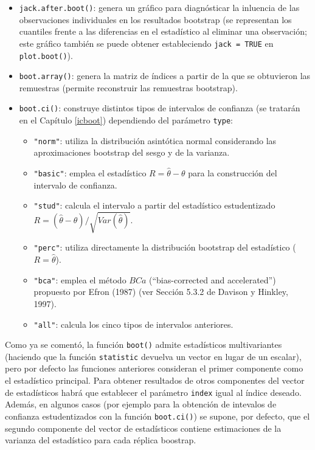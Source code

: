 \documentclass[]{book}
\theoremstyle{break}
\theoremstyle{definition}
\theoremstyle{definition}
\theoremstyle{definition}
\theoremstyle{remark}
\begin{document}
\begin{itemize}
\item
  \texttt{jack.after.boot()}: genera un gráfico para diagnósticar la
  inluencia de las observaciones individuales en los resultados
  bootstrap (se representan los cuantiles frente a las diferencias en el
  estadístico al eliminar una observación; este gráfico también se puede
  obtener estableciendo \texttt{jack\ =\ TRUE} en \texttt{plot.boot()}).
\item
  \texttt{boot.array()}: genera la matriz de índices a partir de la que
  se obtuvieron las remuestras (permite reconstruir las remuestras
  bootstrap).
\item
  \texttt{boot.ci()}: construye distintos tipos de intervalos de
  confianza (se tratarán en el Capítulo \ref{icboot}) dependiendo del
  parámetro \texttt{type}:

  \begin{itemize}
  \item
    \texttt{"norm"}: utiliza la distribución asintótica normal
    considerando las aproximaciones bootstrap del sesgo y de la
    varianza.
  \item
    \texttt{"basic"}: emplea el estadístico \(R = \hat \theta - \theta\)
    para la construcción del intervalo de confianza.
  \item
    \texttt{"stud"}: calcula el intervalo a partir del estadístico
    estudentizado
    \(R = \left( \hat \theta - \theta \right) / \sqrt{Var(\hat \theta)}\).
  \item
    \texttt{"perc"}: utiliza directamente la distribución bootstrap del
    estadístico (\(R = \hat \theta\)).
  \item
    \texttt{"bca"}: emplea el método \(BCa\) (``bias-corrected and
    accelerated'') propuesto por Efron (1987) (ver Sección 5.3.2 de
    Davison y Hinkley, 1997).
  \item
    \texttt{"all"}: calcula los cinco tipos de intervalos anteriores.
  \end{itemize}
\end{itemize}

Como ya se comentó, la función \texttt{boot()} admite estadísticos
multivariantes (haciendo que la función \texttt{statistic} devuelva un
vector en lugar de un escalar), pero por defecto las funciones
anteriores consideran el primer componente como el estadístico
principal. Para obtener resultados de otros componentes del vector de
estadísticos habrá que establecer el parámetro \texttt{index} igual al
índice deseado. Además, en algunos casos (por ejemplo para la obtención
de intevalos de confianza estudentizados con la función
\texttt{boot.ci()}) se supone, por defecto, que el segundo componente
del vector de estadísticos contiene estimaciones de la varianza del
estadístico para cada réplica boostrap.
\end{document}

